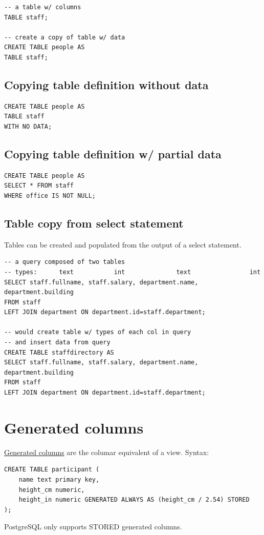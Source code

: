 \documentclass{pgnotes}
\begin{document}
\begin{verbatim}
-- a table w/ columns
TABLE staff;

-- create a copy of table w/ data
CREATE TABLE people AS
TABLE staff;
\end{verbatim}


\subsection{Copying table definition without data}

\begin{verbatim}
CREATE TABLE people AS
TABLE staff 
WITH NO DATA;
\end{verbatim}

\subsection{Copying table definition w/ partial data}

\begin{verbatim}
CREATE TABLE people AS
SELECT * FROM staff
WHERE office IS NOT NULL;
\end{verbatim}

\subsection{Table copy from select statement}

Tables can be created and populated from the output of a select statement.
\begin{verbatim}
-- a query composed of two tables
-- types:      text           int              text                int
SELECT staff.fullname, staff.salary, department.name, department.building
FROM staff
LEFT JOIN department ON department.id=staff.department;

-- would create table w/ types of each col in query
-- and insert data from query
CREATE TABLE staffdirectory AS
SELECT staff.fullname, staff.salary, department.name, department.building
FROM staff
LEFT JOIN department ON department.id=staff.department;

\end{verbatim}

\section{Generated columns}

\href{https://www.postgresql.org/docs/current/ddl-generated-columns.html}{Generated columns} are the columar equivalent of a view.
Syntax: 
\begin{verbatim}
CREATE TABLE participant (
    name text primary key,
    height_cm numeric,
    height_in numeric GENERATED ALWAYS AS (height_cm / 2.54) STORED
);
\end{verbatim}
PostgreSQL only supports STORED generated columns. 
\end{document}
